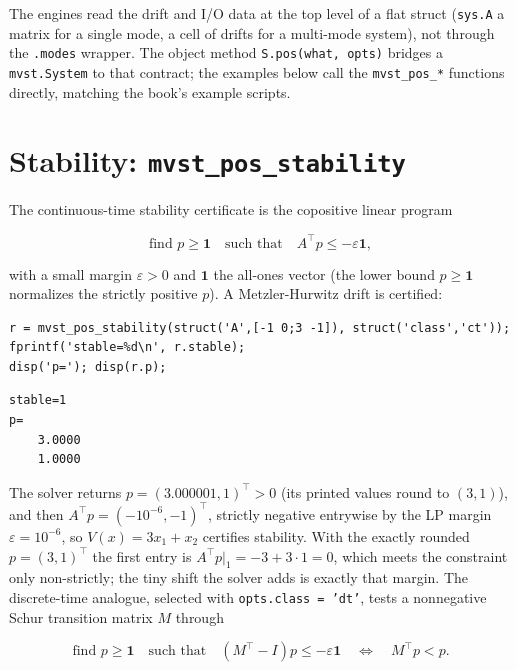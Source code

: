 \documentclass[11pt,oneside]{report}
\newcommand{\code}[1]{\texttt{#1}}
\begin{document}
The engines read the drift and I/O data at the top level of a flat struct
(\code{sys.A} a matrix for a single mode, a cell of drifts for a multi-mode system),
not through the \code{.modes} wrapper. The object method \code{S.pos(what, opts)} bridges a
\code{mvst.System} to that contract; the examples below call the \code{mvst\_pos\_*}
functions directly, matching the book's example scripts.

\hypertarget{stability-mvst_pos_stability}{%
\section{\texorpdfstring{Stability: \code{mvst\_pos\_stability}}{Stability: mvst\_pos\_stability}}\label{stability-mvst_pos_stability}}

The continuous-time stability certificate is the copositive linear program

\[
\text{find } p \ge \mathbf{1}
\quad\text{such that}\quad
A^\top p \le -\varepsilon \mathbf{1},
\]

with a small margin \(\varepsilon > 0\) and \(\mathbf 1\) the all-ones vector (the
lower bound \(p \ge \mathbf 1\) normalizes the strictly positive \(p\)). A
Metzler-Hurwitz drift is certified:

\begin{lstlisting}[style=matlabstyle]
r = mvst_pos_stability(struct('A',[-1 0;3 -1]), struct('class','ct'));
fprintf('stable=%d\n', r.stable);
disp('p='); disp(r.p);
\end{lstlisting}

\begin{lstlisting}[style=outputstyle]
stable=1
p=
    3.0000
    1.0000
\end{lstlisting}

The solver returns \(p = (3.000001, 1)^\top > 0\) (its printed values round to
\((3,1)\)), and then \(A^\top p = (-10^{-6}, -1)^\top\), strictly negative
entrywise by the LP margin \(\varepsilon = 10^{-6}\), so \(V(x) = 3 x_1 + x_2\)
certifies stability. With the exactly rounded \(p = (3,1)^\top\) the first entry is
\(A^\top p|_1 = -3 + 3\cdot 1 = 0\), which meets the constraint only
non-strictly; the tiny shift the solver adds is exactly that margin. The
discrete-time analogue, selected with \code{opts.class = 'dt'}, tests a nonnegative
Schur transition matrix \(M\) through

\[
\text{find } p \ge \mathbf{1}
\quad\text{such that}\quad
(M^\top - I) p \le -\varepsilon \mathbf{1}
\quad\Longleftrightarrow\quad M^\top p < p .
\]
\end{document}
